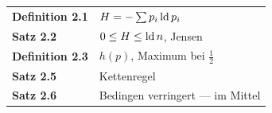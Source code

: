 \begin{merksatz}
\begin{center}
\renewcommand{\arraystretch}{1.5}
\begin{tabular}{@{}P{3.0cm}P{5.6cm}@{}}
\toprule
\textbf{Definition 2.1} & $H = -\sum p_i\operatorname{ld} p_i$\\
\textbf{Satz 2.2} & $0 \le H \le \operatorname{ld} n$, Jensen\\
\textbf{Definition 2.3} & $h(p)$, Maximum bei $\frac12$\\
\textbf{Satz 2.5} & Kettenregel\\
\textbf{Satz 2.6} & Bedingen verringert --- im Mittel\\
\bottomrule
\end{tabular}
\end{center}

\begin{center}
\begin{minipage}{0.88\textwidth}
\end{minipage}
\end{center}
\end{merksatz}
